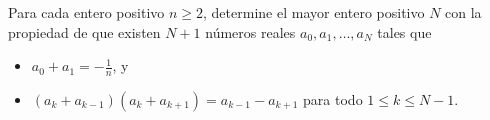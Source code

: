 Para cada entero positivo $n \ge 2$, determine el mayor entero positivo $N$ con la propiedad de que existen $N +1$ números reales $a_0,a_1,\dots,a_N$ tales que
 \begin{itemize} 
 \item  $a_0+a_1=-\frac 1n$, y
 \item  $(a_k+a_{k-1})(a_k+a_{k+1})=a_{k-1}-a_{k+1}$ para todo $1\leq k \leq N-1$.
 \end{itemize} 